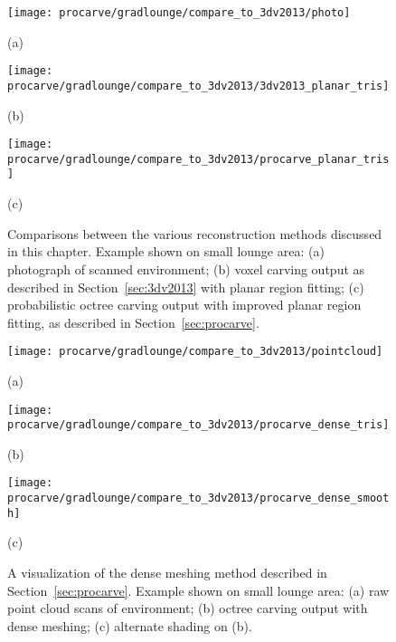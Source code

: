 \documentclass[12pt,onecolumn,oneside]{book}
\begin{document}
\begin{figure}[p]
	
	\centering

	\begin{minipage}[b]{0.65\linewidth}
	\centerline{\texttt{[image: procarve/gradlounge/compare\_to\_3dv2013/photo]}}
	\centerline{(a)}\medskip
	\end{minipage}

	\begin{minipage}[b]{0.65\linewidth}
	\centerline{\texttt{[image: procarve/gradlounge/compare\_to\_3dv2013/3dv2013\_planar\_tris]}}
	\centerline{(b)}\medskip
	\end{minipage}
	
	\begin{minipage}[b]{0.65\linewidth}
	\centerline{\texttt{[image: procarve/gradlounge/compare\_to\_3dv2013/procarve\_planar\_tris]}}
	\centerline{(c)}\medskip
	\end{minipage}

	\caption[Comparison between planar region fitting methods.]{Comparisons between the various reconstruction methods discussed in this chapter.  Example shown on small lounge area:  (a) photograph of scanned environment; (b) voxel carving output as described in Section~\ref{sec:3dv2013} with planar region fitting; (c) probabilistic octree carving output with improved planar region fitting, as described in Section~\ref{sec:procarve}.}
	\label{fig:gradlounge_procarve_compare_part1}
\end{figure}

\begin{figure}[p]
	
	\centering

	\begin{minipage}[b]{0.65\linewidth}
	\centerline{\texttt{[image: procarve/gradlounge/compare\_to\_3dv2013/pointcloud]}}
	\centerline{(a)}\medskip
	\end{minipage}

	\begin{minipage}[b]{0.65\linewidth}
	\centerline{\texttt{[image: procarve/gradlounge/compare\_to\_3dv2013/procarve\_dense\_tris]}}
	\centerline{(b)}\medskip
	\end{minipage}
	
	\begin{minipage}[b]{0.65\linewidth}
	\centerline{\texttt{[image: procarve/gradlounge/compare\_to\_3dv2013/procarve\_dense\_smooth]}}
	\centerline{(c)}\medskip
	\end{minipage}

	\caption[Dense meshing reconstruction.]{A visualization of the dense meshing method described in Section~\ref{sec:procarve}.  Example shown on small lounge area:  (a) raw point cloud scans of environment; (b) octree carving output with dense meshing; (c) alternate shading on (b).}
	\label{fig:gradlounge_procarve_compare_part2}
\end{figure}
\end{document}
